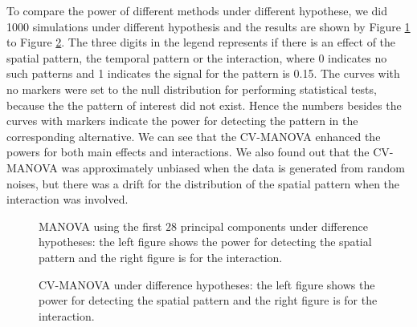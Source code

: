 To compare the power of different methods under different hypothese,
we did 1000 simulations under different hypothesis and the results
are shown by Figure \ref{fig:MANOVA-ss} to Figure \ref{fig:CVMANOVA-ss}.
The three digits in the legend represents if there is an effect of
the spatial pattern, the temporal pattern or the interaction, where
0 indicates no such patterns and 1 indicates the signal for the pattern
is 0.15. The curves with no markers were set to the null distribution
for performing statistical tests, because the the pattern of interest
did not exist. Hence the numbers besides the curves with markers indicate
the power for detecting the pattern in the corresponding alternative.
We can see that the CV-MANOVA enhanced the powers for both main effects
and interactions. We also found out that the CV-MANOVA was approximately
unbiased when the data is generated from random noises, but there
was a drift for the distribution of the spatial pattern when the interaction
was involved.

\begin{figure}[H]
\begin{centering}
\par\end{centering}

\centering{}\protect\caption{MANOVA using the first $28$ principal components under difference
hypotheses: the left figure shows the power for detecting the spatial
pattern and the right figure is for the interaction.\label{fig:MANOVA-ss}}
\end{figure}


\begin{figure}[H]
\begin{centering}
\par\end{centering}

\centering{}\protect\caption{CV-MANOVA under difference hypotheses: the left figure shows the power
for detecting the spatial pattern and the right figure is for the
interaction.\label{fig:CVMANOVA-ss}}
\end{figure}



